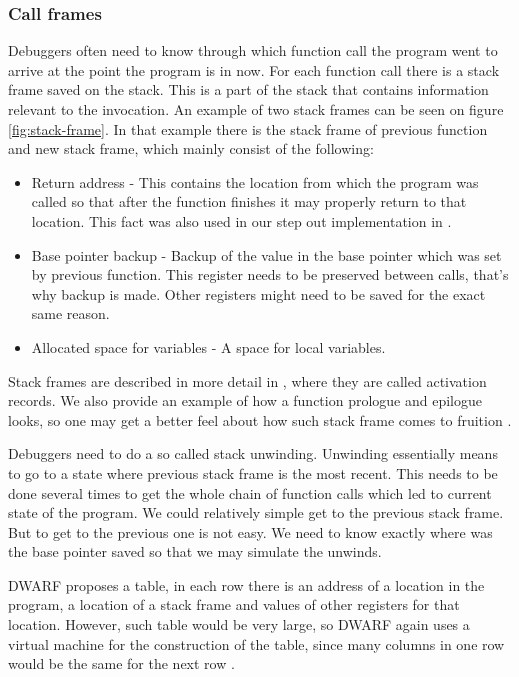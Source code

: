\subsubsection{Call frames}
Debuggers often need to know through which function call the program went to
arrive at the point the program is in now. For each function call there is a
stack frame saved on the stack. This is a part of the stack that contains
information relevant to the invocation. An example of two stack frames can be
seen on figure \ref{fig:stack-frame}. In that example there is the stack frame
of previous function and new stack frame, which mainly consist of the
following:
\begin{itemize}
    \item Return address - This contains the location from which the program
        was called so that after the function finishes it may properly return
        to that location. This fact was also used in our step out
        implementation in .
    \item Base pointer backup - Backup of the value in the base pointer which
        was set by previous function. This register needs to be preserved
        between calls, that's why backup is made. Other registers might need to
        be saved for the exact same reason.
    \item Allocated space for variables - A space for local variables.
\end{itemize}
Stack frames are described in more detail in \cite{dragon-book}, where they are
called activation records. We also provide an example of how a function
prologue and epilogue looks, so one may get a better feel about how such stack
frame comes to fruition \cite{fig:prologue-and-epilogue}.

Debuggers need to do a so called stack unwinding. Unwinding essentially means
to go to a state where previous stack frame is the most recent. This needs to
be done several times to get the whole chain of function calls which led to
current state of the program. We could relatively simple get to the previous
stack frame. But to get to the previous one is not easy. We need to know
exactly where was the base pointer saved so that we may simulate the unwinds.

DWARF proposes a table, in each row there is an address of a location in the
program, a location of a stack frame and values of other registers for that
location. However, such table would be very large, so DWARF again uses a
virtual machine for the construction of the table, since many columns in one
row would be the same for the next row \cite{dwarf}. 

